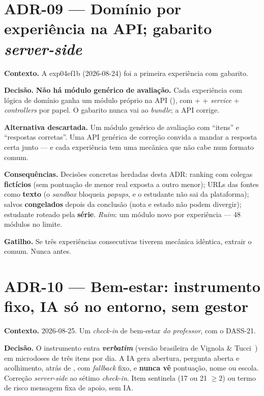 \section{ADR-09 --- Domínio por experiência na API; gabarito \emph{server-side}}

\textbf{Contexto.} A exp04ef1b (2026-08-24) foi a primeira experiência com gabarito.

\textbf{Decisão.} \textbf{Não há módulo genérico de avaliação.} Cada experiência
com lógica de domínio ganha um módulo próprio na API (), com
 +  + \emph{service} + \emph{controllers} por
papel. O gabarito nunca vai ao \emph{bundle}; a API corrige.

\textbf{Alternativa descartada.} Um módulo genérico de avaliação com
\enquote{itens} e \enquote{respostas corretas}. Uma API genérica de correção
convida a mandar a resposta certa junto --- e cada experiência tem uma mecânica
que não cabe num formato comum.

\textbf{Consequências.} Decisões concretas herdadas desta ADR: ranking com
colegas \textbf{fictícios} (sem pontuação de menor real exposta a outro menor);
URLs das fontes como \textbf{texto} (o \emph{sandbox} bloqueia \emph{popups}, e o
estudante não sai da plataforma); salvos \textbf{congelados} depois da conclusão
(nota e estado não podem divergir); estudante roteado pela \textbf{série}.
\emph{Ruim}: um módulo novo por experiência --- 48 módulos no limite.

\textbf{Gatilho.} Se três experiências consecutivas tiverem mecânica idêntica,
extrair o comum. Nunca antes.

\section{ADR-10 --- Bem-estar: instrumento fixo, IA só no entorno, sem gestor}

\textbf{Contexto.} 2026-08-25. Um \emph{check-in} de bem-estar \emph{do
professor}, com o DASS-21.

\textbf{Decisão.} O instrumento entra \textbf{\emph{verbatim}} (versão brasileira
de Vignola \& Tucci~\cite{vignola2014dass21}) em microdoses de três itens por dia.
A IA gera abertura, pergunta aberta e acolhimento, atrás de
, com \emph{fallback} fixo, e \textbf{nunca vê}
pontuação, nome ou escola. Correção \emph{server-side} ao sétimo \emph{check-in}.
Item sentinela (17 ou 21 $\geq 2$) ou termo de risco \implica{} mensagem fixa de
apoio, sem IA.

